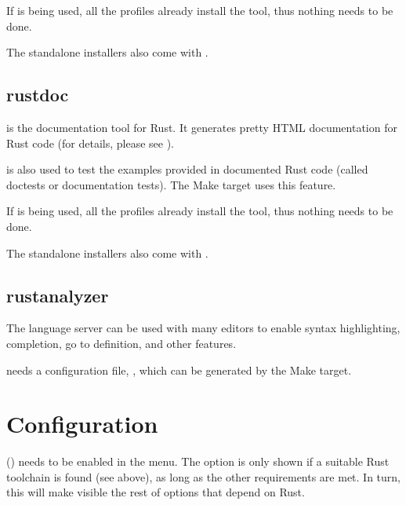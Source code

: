 \documentclass[a4paper,11pt,english]{sphinxmanual}
\begin{document}
If  is being used, all the profiles already install the tool,
thus nothing needs to be done.

The standalone installers also come with .


\subsection{rustdoc}
\label{\detokenize{quick-start:rustdoc}}
 is the documentation tool for Rust. It generates pretty HTML
documentation for Rust code (for details, please see
{\hyperref[\detokenize{general-information::doc}]{}}).

 is also used to test the examples provided in documented Rust code
(called doctests or documentation tests). The  Make target uses
this feature.

If  is being used, all the profiles already install the tool,
thus nothing needs to be done.

The standalone installers also come with .


\subsection{rust\sphinxhyphen{}analyzer}
\label{\detokenize{quick-start:rust-analyzer}}
The  language server can
be used with many editors to enable syntax highlighting, completion, go to
definition, and other features.

 needs a configuration file, , which
can be generated by the  Make target.


\section{Configuration}
\label{\detokenize{quick-start:configuration}}
 () needs to be enabled in the 
menu. The option is only shown if a suitable Rust toolchain is found (see
above), as long as the other requirements are met. In turn, this will make
visible the rest of options that depend on Rust.
\end{document}
